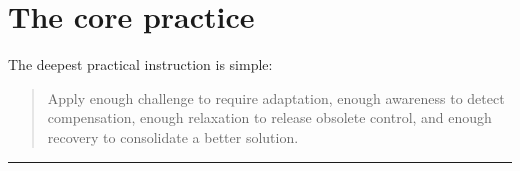 \section{The core practice}

The deepest practical instruction is simple:

\begin{quote}
Apply enough challenge to require adaptation, enough awareness to detect compensation, enough relaxation to release obsolete control, and enough recovery to consolidate a better solution.
\end{quote}

\begin{center}\rule{0.5\linewidth}{0.5pt}\end{center}
